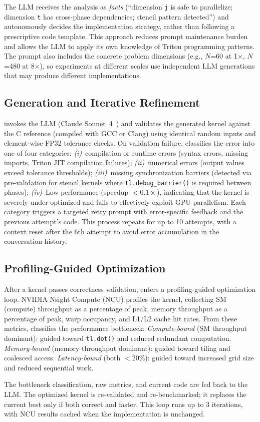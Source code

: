 The LLM receives the analysis as \emph{facts} (``dimension \texttt{j} is safe to parallelize; dimension \texttt{t} has cross-phase dependencies; stencil pattern detected'') and autonomously decides the implementation strategy, rather than following a prescriptive code template. This approach reduces prompt maintenance burden and allows the LLM to apply its own knowledge of Triton programming patterns.
The prompt also includes the concrete problem dimensions (e.g., $N$=60 at 1$\times$, $N$=480 at 8$\times$), so experiments at different scales use independent LLM generations that may produce different implementations.

\subsection{Generation and Iterative Refinement}
\sysname invokes the LLM (Claude Sonnet~4~\cite{anthropic2025claude}) and validates the generated kernel against the C reference (compiled with GCC or Clang) using identical random inputs and element-wise FP32 tolerance checks. On validation failure, \sysname classifies the error into one of four categories:
\emph{(i)}~compilation or runtime errors (syntax errors, missing imports, Triton JIT compilation failures);
\emph{(ii)}~numerical errors (output values exceed tolerance thresholds);
\emph{(iii)}~missing synchronization barriers (detected via pre-validation for stencil kernels where \texttt{tl.debug\_barrier()} is required between phases);
\emph{(iv)}~Low performance (speedup $< 0.1\times$), indicating that the kernel is severely under-optimized and fails to effectively exploit GPU parallelism.
Each category triggers a targeted retry prompt with error-specific feedback and the previous attempt's code. This process repeats for up to 10 attempts, with a context reset after the 6th attempt to avoid error accumulation in the conversation history.

\subsection{Profiling-Guided Optimization}
\label{sec:profiling}
After a kernel passes correctness validation, \sysname enters a profiling-guided optimization loop. NVIDIA Nsight Compute (NCU) profiles the kernel, collecting SM (compute) throughput as a percentage of peak, memory throughput as a percentage of peak, warp occupancy, and L1/L2 cache hit rates. From these metrics, \sysname classifies the performance bottleneck:
\emph{Compute-bound} (SM throughput dominant): guided toward \texttt{tl.dot()} and reduced redundant computation.
\emph{Memory-bound} (memory throughput dominant): guided toward tiling and coalesced access.
\emph{Latency-bound} (both $<$20\%): guided toward increased grid size and reduced sequential work.

The bottleneck classification, raw metrics, and current code are fed back to the LLM. The optimized kernel is re-validated and re-benchmarked; it replaces the current best only if both correct and faster. This loop runs up to 3 iterations, with NCU results cached when the implementation is unchanged.
